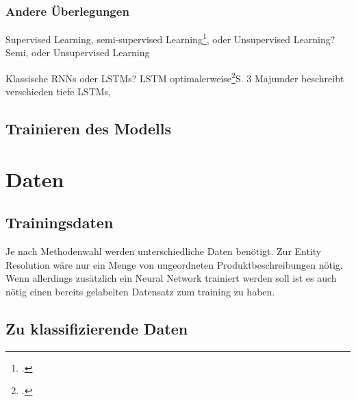 \documentclass[paper=a4,12pt,listof=totoc]{scrartcl}%
\begin{document}
	
	
	\subsubsection{Andere Überlegungen}
	Supervised Learning, semi-supervised Learning\footcite{Ghani.2006}, oder Unsupervised Learning? Semi, oder Unsupervised Learning
	
	Klassische RNNs oder LSTMs? LSTM optimalerweise\footcite{Majumder.30.03.2018}{S. 3} Majumder beschreibt verschieden tiefe LSTMs, 
	\subsection{Trainieren des Modells}
	
	\section{Daten}
	\subsection{Trainingsdaten}
		Je nach Methodenwahl werden unterschiedliche Daten benötigt. Zur Entity Resolution wäre nur ein Menge von ungeordneten Produktbeschreibungen nötig. Wenn allerdings zusätzlich ein Neural Network trainiert werden soll ist es auch nötig einen bereits gelabelten Datensatz zum training zu haben.
	\subsection{Zu klassifizierende Daten}
	\printbibliography[title=Literaturverzeichnis]
\end{document}
